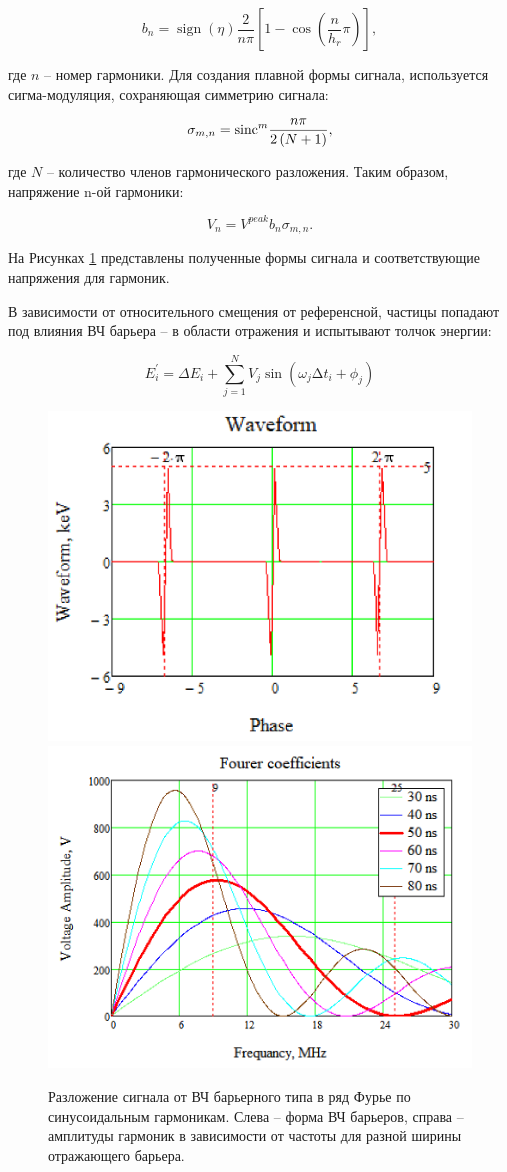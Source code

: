 \documentclass[a4paper]{panl}
\begin{document}
\begin{equation}
b_n=\operatorname{sign}{\left(\eta\right)}\frac{2}{n\pi}\left[1-\cos{\left(\frac{n}{h_r}\pi\right)}\right],
\label{b}
\end{equation}

где $n$ – номер гармоники. Для создания плавной формы сигнала, используется сигма-модуляция, сохраняющая симметрию сигнала:

\begin{equation}
\sigma_{m, n}={\rm sinc}^m{\frac{n\pi}{2\left(N+1\right)}},
\label{sigma}
\end{equation}

где $N$ – количество членов гармонического разложения. Таким образом, напряжение n-ой гармоники:

\begin{equation}
V_n=V^{peak}b_n\sigma_{m, n}.
\label{Volt_n}
\end{equation}

На Рисунках \ref{fig:wave} представлены полученные формы сигнала и со\-от\-вет\-ству\-ющ\-ие напряжения для гармоник.

В зависимости от относительного смещения от референсной, частицы попадают под влияния ВЧ барьера – в области отражения и испытывают толчок энергии:

\begin{equation}
E_i^\prime=\Delta E_i+\sum_{j=1}^{N} V_j\sin{\left(\omega_{j}\mathrm{\Delta}t_i+\phi_j\right)} 
\label{dE}
\end{equation}

\begin{figure}[!htb]
   \includegraphics*[width=.49\columnwidth]{img/fig_05-1}
   \includegraphics*[width=.49\columnwidth]{img/fig_05-2}
   \caption{Разложение сигнала от ВЧ барьерного типа в ряд Фурье по синусоидальным гармоникам. Слева – форма 
   ВЧ барьеров, справа – амплитуды гармоник в зависимости от частоты для разной ширины отражающего барьера.}
   \label{fig:wave}
\end{figure}
\end{document}
